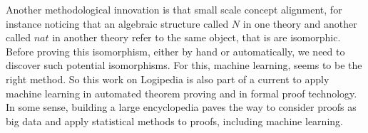 Another methodological innovation is that small scale concept
alignment, for instance noticing that an algebraic structure called
$N$ in one theory and another called $nat$ in another theory refer to
the same object, that is are isomorphic. Before proving this
isomorphism, either by hand or automatically, we need to discover such
potential isomorphisms. For this, machine learning, seems to be the
right method. So this work on Logipedia is also part of a current to
apply machine learning in automated theorem proving and in formal
proof technology. In some sense, building a large encyclopedia paves
the way to consider proofs as big data and apply statistical methods to 
proofs, including machine learning.

